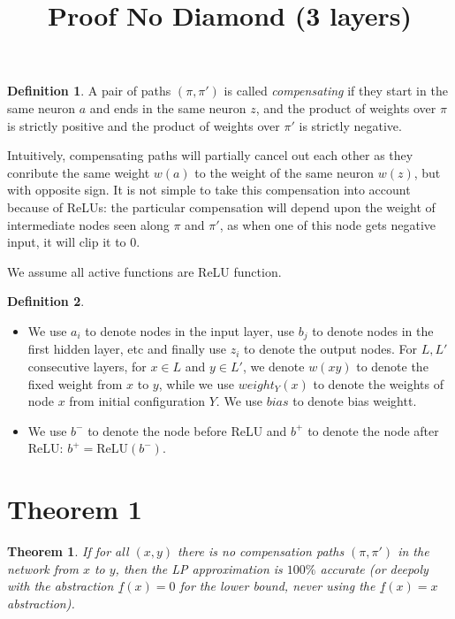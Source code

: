 \documentclass[]{article}
\title{Proof No Diamond (3 layers)}
\date{}
\newtheorem{theorem}{Theorem}
\theoremstyle{definition}
\newtheorem{definition}{Definition}
\newcommand{\ReLU}{\mathrm{ReLU}}
\begin{document}
\maketitle

\begin{definition}
	A pair of paths $(\pi,\pi')$
	is called {\em compensating} if they start in the same neuron $a$ and 
	ends in the same neuron $z$, and the product of weights over $\pi$ is strictly positive and the product of weights over $\pi'$ is strictly negative.
\end{definition}

Intuitively, compensating paths will partially cancel out each other as they conribute the same weight $w(a)$ to the weight of the same neuron $w(z)$, but with opposite sign. 
It is not simple to take this compensation into account because of ReLUs: the particular compensation will depend upon the weight of intermediate nodes seen along $\pi$ and $\pi'$, 
as when one of this node gets negative input, it will clip it to 0.


We assume all active functions are ReLU function.

\begin{definition}

	\begin{itemize}
	 \item  We use $a_i$ to denote nodes in the input layer, use $b_j$ to denote nodes in the first hidden layer, etc and finally use $z_i$ to denote the output nodes.
	For $L,L'$ consecutive layers, for $x \in L$ and $y \in L'$, we denote 
	$w({x y})$ to denote the fixed weight from $x$ to $y$, while we use
	$weight_Y(x)$ to denote the weights of node $x$ from initial configuration $Y$. 
	We use $bias$ to denote bias weightt.
	
	\item We use $b^-$ to denote the node before ReLU and $b^+$ to denote the node after ReLU: $b^+ = \ReLU(b^-)$.
	\end{itemize}
	
\end{definition}


\section{Theorem 1}



\begin{theorem}
	\label{th1}
	If for all $(x,y)$ there is no compensation paths $(\pi,\pi')$ 
	in the network from $x$ to $y$, then the LP approximation is 
	$100\%$ accurate (or deepoly with the abstraction $\underline{f}(x) = 0$ for the lower bound, never using the $\underline{f}(x) = x$ abstraction). 
\end{theorem}
\end{document}
